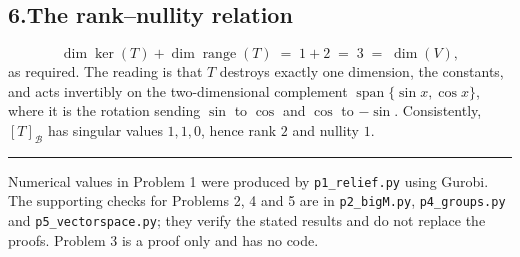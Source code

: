 \documentclass[11pt]{article}
\DeclareMathOperator{\spn}{span}
\theoremstyle{definition}\newtheorem*{definition}{Definition}
\theoremstyle{definition}
\begin{document}
\subsection*{6.\quad The rank--nullity relation}

\[
  \dim \ker(T) + \dim \operatorname{range}(T)
  \;=\; 1 + 2 \;=\; 3 \;=\; \dim(V) ,
\]
as required. The reading is that $T$ destroys exactly one dimension, the
constants, and acts invertibly on the two-dimensional complement
$\spn\{\sin x, \cos x\}$, where it is the rotation sending $\sin$ to
$\cos$ and $\cos$ to $-\sin$. Consistently, $[T]_{\mathcal{B}}$ has
singular values $1, 1, 0$, hence rank $2$ and nullity $1$.

\vspace{1em}
\hrule
\vspace{0.6em}
{\small Numerical values in Problem 1 were produced by
\texttt{p1\_relief.py} using Gurobi. The supporting checks for Problems
2, 4 and 5 are in \texttt{p2\_bigM.py}, \texttt{p4\_groups.py} and
\texttt{p5\_vectorspace.py}; they verify the stated results and do not
replace the proofs. Problem 3 is a proof only and has no code.}
\end{document}
